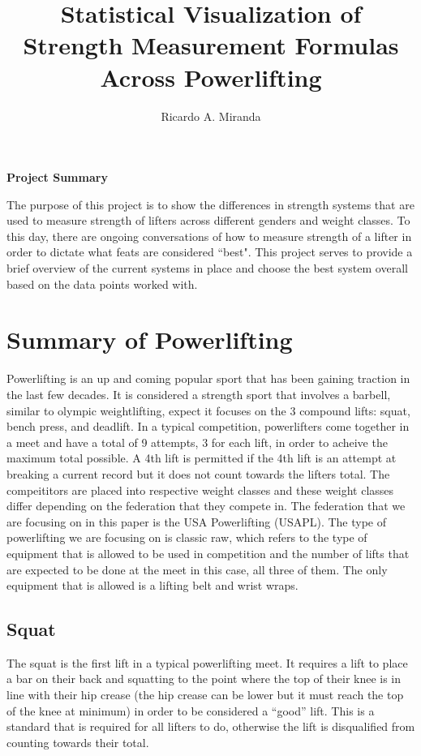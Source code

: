 \documentclass[10pt,letterpaper]{article}
\title{Statistical Visualization of Strength Measurement Formulas Across Powerlifting}
\author{Ricardo A. Miranda}
\begin{document}
    \maketitle
    \begin{center}
        \textbf{Project Summary}
    
    \end{center}
    The purpose of this project is to show the differences in strength systems that are used to measure strength of lifters across different genders and weight classes. To this day, there are ongoing conversations of how to measure strength of a lifter in order to dictate what feats are considered ``best". This project serves to provide a brief overview of the current systems in place and choose the best system overall based on the data points worked with.

    \tableofcontents

    \newpage

    \section{Summary of Powerlifting}
    Powerlifting is an up and coming popular sport that has been gaining traction in the last few decades. It is considered a strength sport that involves a barbell, similar to olympic weightlifting, expect it focuses on the 3 compound lifts: squat, bench press, and deadlift. In a typical competition, powerlifters come together in a meet and have a total of 9 attempts, 3 for each lift, in order to acheive the maximum total possible. A 4th lift is permitted if the 4th lift is an attempt at breaking a current record but it does not count towards the lifters total. The compeititors are placed into respective weight classes and these weight classes differ depending on the federation that they compete in. The federation that we are focusing on in this paper is the USA Powerlifting (USAPL). The type of powerlifting we are focusing on is classic raw, which refers to the type of equipment that is allowed to be used in competition and the number of lifts that are expected to be done at the meet in this case, all three of them. The only equipment that is allowed is a lifting belt and wrist wraps. 
    \subsection*{Squat}
    The squat is the first lift in a typical powerlifting meet. It requires a lift to place a bar on their back and squatting to the point where the top of their knee is in line with their hip crease (the hip crease can be lower but it must reach the top of the knee at minimum) in order to be considered a ``good'' lift. This is a standard that is required for all lifters to do, otherwise the lift is disqualified from counting towards their total.
\end{document}
